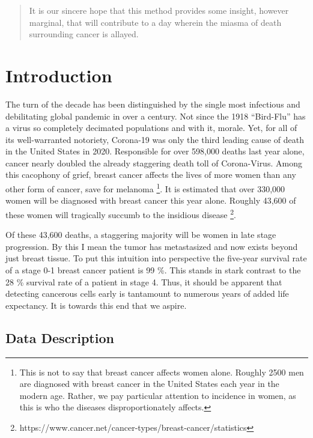 \documentclass[10pt]{article}
\begin{document}
\begin{abstract}
	It is our sincere hope that this method provides some insight, however marginal, that will contribute to a day wherein the miasma of death surrounding cancer is allayed.  
	
\end{abstract}

\section{Introduction}

The turn of the decade has been distinguished by the single most infectious and debilitating global pandemic in over a century.  Not since the 1918 “Bird-Flu” has a virus so completely decimated populations and with it, morale.  Yet, for all of its well-warranted notoriety, Corona-19 was only the third leading cause of death in the United States in 2020.  Responsible for over 598,000 deaths last year alone, cancer nearly doubled the already staggering death toll of Corona-Virus.  Among this cacophony of grief, breast cancer affects the lives of more women than any other form of cancer, save for melanoma \footnote{This is not to say that breast cancer affects women alone.  Roughly 2500 men are diagnosed with breast cancer in the United States each year in the modern age.  Rather, we pay particular attention to incidence in women, as this is who the diseases disproportionately affects.}.  It is estimated that over 330,000 women will be diagnosed with breast cancer this year alone.  Roughly 43,600 of these women will tragically succumb to the insidious disease \footnote{https://www.cancer.net/cancer-types/breast-cancer/statistics}.  

	Of these 43,600 deaths, a staggering majority will be women in late stage progression.  By this I mean the tumor has metastasized and now exists beyond just breast tissue.  To put this intuition into perspective the five-year survival rate of a stage 0-1 breast cancer patient is 99 \%.  This stands in stark contrast to the 28 \% survival rate of a patient in stage 4.  Thus, it should be apparent that detecting cancerous cells early is tantamount to numerous years of added life expectancy.  It is towards this end that we aspire.  
	
\subsection{Data Description}
\end{document}
